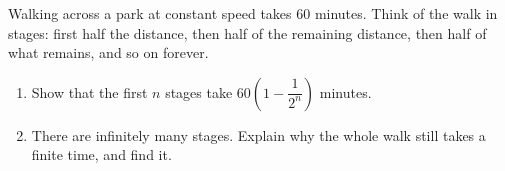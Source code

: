 Walking across a park at constant speed takes $60$ minutes. Think of the walk in stages: first half the distance, then half of the remaining distance, then half of what remains, and so on forever.
\begin{enumerate}
\item[(a)] Show that the first $n$ stages take $60\left(1-\dfrac1{2^n}\right)$ minutes.
\item[(b)] There are infinitely many stages. Explain why the whole walk still takes a finite time, and find it.
\end{enumerate}

